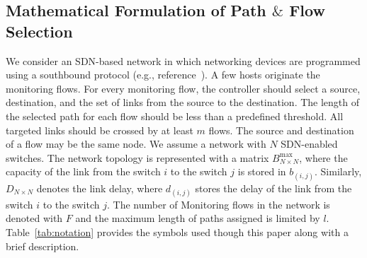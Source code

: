 \documentclass[10pt, journal, letterpaper]{IEEEtran}
\begin{document}
\subsection{Mathematical Formulation of Path $\&$ Flow Selection}\label{subsec:mathematical_formulation}
We consider an SDN-based network in which networking devices are programmed using a southbound protocol (e.g., reference~\cite{ventre2018sdn}). A few hosts originate the monitoring flows. %
For every monitoring flow, the controller should select a source, destination, and the set of links from the source to the destination. The length of the selected path for each flow should be less than a predefined threshold. All targeted links should be crossed by at least $m$ flows. The source and destination of a flow may be the same node. We assume a network with $N$ SDN-enabled switches. The network topology is represented with a matrix $B^{\max}_{N\times N}$, where the capacity of the link from the switch $i$ to the switch $j$ is stored in $b_{(i,j)}$. Similarly, $D_{N\times N}$ denotes the link delay, where $d_{(i,j)}$ stores the delay of the link from the switch $i$ to the switch $j$. The number of Monitoring flows in the network is denoted with $F$ and the maximum length of paths assigned is limited by $l$. Table~\ref{tab:notation} provides the symbols used though this paper along with a brief description.
\end{document}
